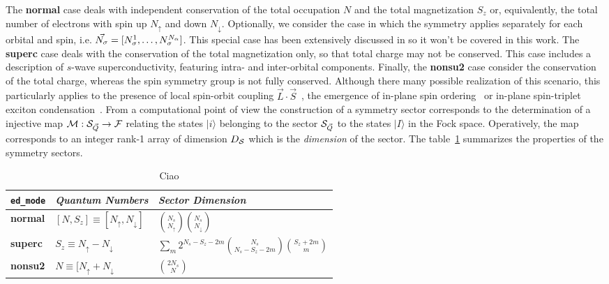 \documentclass[preprint,3p,10pt]{elsarticle}
\newcommand{\onlinecite}[1]{\nocite{#1}\hspace{-0.1cm}\citenum{#1}}
\newcommand{\ket}[1]
{|#1\rangle}
\def\a{\alpha}       \def\b{\beta}   \def\g{\gamma}   \def\d{\delta}
\def\up{\uparrow} \def\down{\downarrow} \def\dw{\downarrow}
\begin{document}
The {\bf normal} case deals with independent conservation of the total occupation $N$
and the total magnetization $S_z$ or, equivalently, the total number of electrons with spin up $N_\up$ and down
$N_\dw$. Optionally, we consider the case in which the symmetry
applies separately for each orbital and spin,
i.e. $\vec{N_\s}=[N^1_\s,\dots,N^{N_\a}_\s]$. This special case has been
extensively discussed in \onlinecite{Amaricci2022} so it won't be covered in
this work.
%
The {\bf superc} case deals with the conservation of the total
magnetization only, so that total charge may not be conserved. This
case includes a description of $s$-wave superconductivity, featuring
intra- and inter-orbital components.
%
Finally, the {\bf nonsu2} case consider the conservation of the total
charge, whereas the spin symmetry group is not fully
conserved. Although there many possible realization of this scenario,
this particularly applies to the presence of local spin-orbit coupling
$\vec{L}\cdot\vec{S}$~\cite{something}, the emergence of in-plane spin ordering~\cite{KM} or
in-plane spin-triplet exciton condensation~\cite{ExcitonPRB,Amaricci,Blason}.  
%
From a computational point of view the construction of a symmetry
sector corresponds to the determination of a injective map
${\cal M}:{\cal S}_{\vec{Q}}\rightarrow {\cal F}$ relating the states $\ket{i}$
belonging to the sector ${\cal S}_{\vec{Q}}$ to the states $\ket{I}$ in the
Fock space. Operatively, the map corresponds to an integer rank-1
array of dimension $D_{\cal S}$ which is the {\it dimension} of the
sector. 
The table~\ref{TabSector} summarizes the properties of the symmetry
sectors. 

\begin{table}%
  \label{TabSector}
\begin{center}
\begin{tabularx}{\linewidth}{ |X|X|X| } 
 \hline
  {\tt ed\_mode} & {\it Quantum Numbers} & {\it Sector Dimension} \\
  \hline
  {\bf normal} & $[N,S_z]\equiv[N_\up,N_\dw]$ &
                                                $\binom{N_s}{N_\up}\binom{N_s}{N_\dw}$
  \\
  \hline
  {\bf superc} & $S_z\equiv N_\up-N_\dw$ &  $\sum_m 2^{N_s-S_z-2m}\binom{N_s}{N_s-S_z-2m}\binom{S_z+2m}{m}$
  \\
  \hline
  {\bf nonsu2} & $N \equiv[N_\up+N_\dw$ & $\binom{2N_s}{N}$ \\ 
 \hline
\end{tabularx}
\end{center}
\caption{Ciao}
\end{table}
\end{document}
